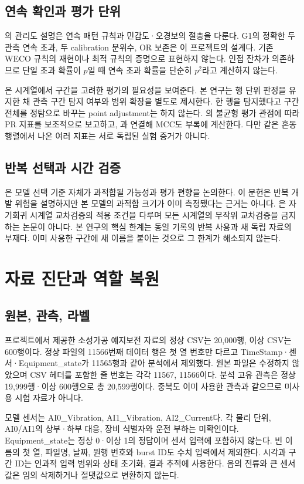 \documentclass{article}
\begin{document}
\subsection{연속 확인과 평가 단위}
\citet{nist}의 관리도 설명은 연속 패턴 규칙과 민감도·오경보의 절충을 다룬다. G1의 정확한 두 관측 연속 초과, 두 calibration 분위수, OR 보존은 이 프로젝트의 설계다. 기존 WECO 규칙의 재현이나 최적 규칙의 증명으로 표현하지 않는다. 인접 잔차가 의존하므로 단일 초과 확률이 $p$일 때 연속 초과 확률을 단순히 $p^2$라고 계산하지 않는다.

\citet{tatbul2018}은 시계열에서 구간을 고려한 평가의 필요성을 보여준다. 본 연구는 행 단위 판정을 유지한 채 관측 구간 탐지 여부와 범위 확장을 별도로 제시한다. 한 행을 탐지했다고 구간 전체를 정탐으로 바꾸는 point adjustment는 하지 않는다. \citet{saito2015}의 불균형 평가 관점에 따라 PR 지표를 보조적으로 보고하고, \citet{chicco2020}과 연결해 MCC도 부록에 계산한다. 다만 같은 혼동행렬에서 나온 여러 지표는 서로 독립된 실험 증거가 아니다.

\subsection{반복 선택과 시간 검증}
\citet{cawley2010}은 모델 선택 기준 자체가 과적합될 가능성과 평가 편향을 논의한다. 이 문헌은 반복 개발 위험을 설명하지만 본 모델의 과적합 크기가 이미 측정됐다는 근거는 아니다. \citet{bergmeir2018}은 자기회귀 시계열 교차검증의 적용 조건을 다루며 모든 시계열의 무작위 교차검증을 금지하는 논문이 아니다. 본 연구의 핵심 한계는 동일 기록의 반복 사용과 새 독립 자료의 부재다. 이미 사용한 구간에 새 이름을 붙이는 것으로 그 한계가 해소되지 않는다.

\section{자료 진단과 역할 복원}
\subsection{원본, 관측, 라벨}
프로젝트에서 제공한 소성가공 예지보전 자료의 정상 CSV는 20,000행, 이상 CSV는 600행이다. 정상 파일의 11566번째 데이터 행은 첫 열 번호만 다르고 TimeStamp·센서·Equipment\_state가 11565행과 같아 분석에서 제외했다. 원본 파일은 수정하지 않았으며 CSV 헤더를 포함한 줄 번호는 각각 11567, 11566이다. 분석 고유 관측은 정상 19,999행·이상 600행으로 총 20,599행이다. 중복도 이미 사용한 관측과 같으므로 미사용 시험 자료가 아니다.

모델 센서는 AI0\_Vibration, AI1\_Vibration, AI2\_Current다. 각 물리 단위, AI0/AI1의 상부·하부 대응, 장비 식별자와 운전 부하는 미확인이다. Equipment\_state는 정상 0·이상 1의 정답이며 센서 입력에 포함하지 않는다. 빈 이름의 첫 열, 파일명, 날짜, 원행 번호와 burst ID도 수치 입력에서 제외한다. 시각과 구간 ID는 인과적 입력 범위와 상태 초기화, 결과 추적에 사용한다. 음의 전류와 큰 센서값은 임의 삭제하거나 절댓값으로 변환하지 않는다.
\end{document}
